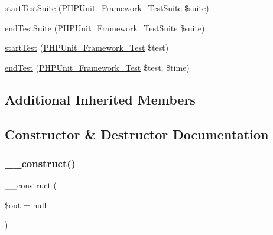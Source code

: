 \begin{DoxyCompactItemize}
\item 
\mbox{\hyperlink{class_p_h_p_unit___util___test_dox___result_printer___x_m_l_a901a86a623d83184267b21f2daee0ff5}{start\+Test\+Suite}} (\mbox{\hyperlink{class_p_h_p_unit___framework___test_suite}{P\+H\+P\+Unit\+\_\+\+Framework\+\_\+\+Test\+Suite}} \$suite)
\item 
\mbox{\hyperlink{class_p_h_p_unit___util___test_dox___result_printer___x_m_l_aeec28a4d1328434916ebcdc1ca6b5527}{end\+Test\+Suite}} (\mbox{\hyperlink{class_p_h_p_unit___framework___test_suite}{P\+H\+P\+Unit\+\_\+\+Framework\+\_\+\+Test\+Suite}} \$suite)
\item 
\mbox{\hyperlink{class_p_h_p_unit___util___test_dox___result_printer___x_m_l_a1a9bddc54f26bb3fb5c2ec9778ea5198}{start\+Test}} (\mbox{\hyperlink{interface_p_h_p_unit___framework___test}{P\+H\+P\+Unit\+\_\+\+Framework\+\_\+\+Test}} \$test)
\item 
\mbox{\hyperlink{class_p_h_p_unit___util___test_dox___result_printer___x_m_l_a6de65eea8b294795cbc34c4c8cee8546}{end\+Test}} (\mbox{\hyperlink{interface_p_h_p_unit___framework___test}{P\+H\+P\+Unit\+\_\+\+Framework\+\_\+\+Test}} \$test, \$time)
\end{DoxyCompactItemize}
\subsection*{Additional Inherited Members}


\subsection{Constructor \& Destructor Documentation}
\mbox{\label{class_p_h_p_unit___util___test_dox___result_printer___x_m_l_a058d0261b18ee18c9fad1ffb1d08775c}} 
\subsubsection{\texorpdfstring{\+\_\+\+\_\+construct()}{\_\_construct()}}
{\footnotesize\ttfamily \+\_\+\+\_\+construct (\begin{DoxyParamCaption}\item[{}]{\$out = {\ttfamily null} }\end{DoxyParamCaption})}


